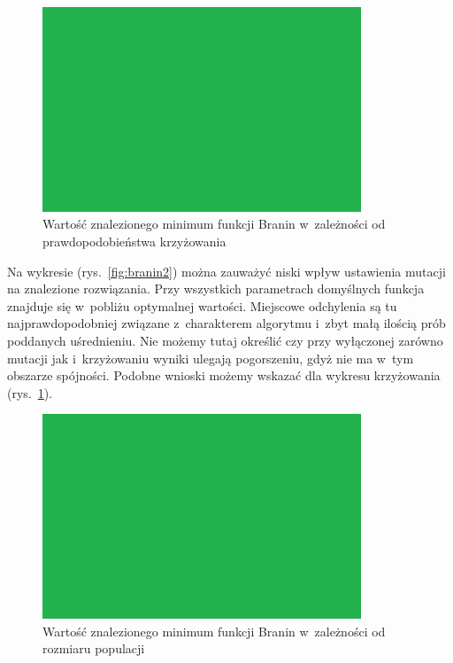 \documentclass[11pt, a4paper]{article}
\newcommand{\fbi}{\leavevmode{\parindent=1em\indent}}
\begin{document}
\begin{figure}[H]
	\centering
	\includegraphics[width=0.85\textwidth]{./assets/test.png}
	\caption{Wartość znalezionego minimum funkcji Branin w~zależności od prawdopodobieństwa krzyżowania}
	\label{fig:branin3}
\end{figure}

\fbi
Na wykresie (rys.~\ref{fig:branin2}) można zauważyć niski wpływ ustawienia mutacji na znalezione rozwiązania. Przy wszystkich parametrach domyślnych funkcja znajduje się w~pobliżu optymalnej wartości. Miejscowe odchylenia są tu najprawdopodobniej związane z~charakterem algorytmu i~zbyt małą ilością prób poddanych uśrednieniu. Nie możemy tutaj określić czy przy wyłączonej zarówno mutacji jak i~krzyżowaniu wyniki ulegają pogorszeniu, gdyż nie ma w~tym obszarze spójności. Podobne wnioski możemy wskazać dla wykresu krzyżowania (rys.~\ref{fig:branin3}).

\begin{figure}[H]
	\centering
	\includegraphics[width=0.85\textwidth]{./assets/test.png}
	\caption{Wartość znalezionego minimum funkcji Branin w~zależności od rozmiaru populacji}
	\label{fig:branin4}
\end{figure}
\end{document}
